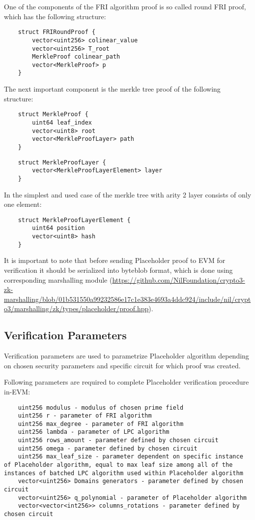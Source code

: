 One of the components of the FRI algorithm proof is so called round FRI proof, which has the following structure:

\begin{verbatim}
    struct FRIRoundProof {
        vector<uint256> colinear_value
        vector<uint256> T_root
        MerkleProof colinear_path
        vector<MerkleProof> p
    }
\end{verbatim}

The next important component is the merkle tree proof of the following structure:

\begin{verbatim}
    struct MerkleProof {
        uint64 leaf_index
        vector<uint8> root
        vector<MerkleProofLayer> path
    }
\end{verbatim}

\begin{verbatim}
    struct MerkleProofLayer {
        vector<MerkleProofLayerElement> layer
    }       
\end{verbatim}

In the simplest and used case of the merkle tree with arity 2 layer consists of only one element:

\begin{verbatim}
    struct MerkleProofLayerElement {
        uint64 position
        vector<uint8> hash
    }
\end{verbatim}

It is important to note that before sending Placeholder proof to EVM for verification it should be serialized into byteblob format,
which is done using corresponding marshalling module 
(\url{https://github.com/NilFoundation/crypto3-zk-marshalling/blob/01b531550a99232586e17c1e383e4693a4ddc924/include/nil/crypto3/marshalling/zk/types/placeholder/proof.hpp}).

\subsection{Verification Parameters}

Verification parameters are used to parametrize Placeholder algorithm depending on chosen security parameters and specific circuit for which proof was created.

Following parameters are required to complete Placeholder verification procedure in-EVM:

\begin{verbatim}
    uint256 modulus - modulus of chosen prime field
    uint256 r - parameter of FRI algorithm
    uint256 max_degree - parameter of FRI algorithm
    uint256 lambda - parameter of LPC algorithm
    uint256 rows_amount - parameter defined by chosen circuit
    uint256 omega - parameter defined by chosen circuit
    uint256 max_leaf_size - parameter dependent on specific instance of Placeholder algorithm, equal to max leaf size among all of the instances of batched LPC algorithm used within Placeholder algorithm
    vector<uint256> Domains generators - parameter defined by chosen circuit 
    vector<uint256> q_polynomial - parameter of Placeholder algorithm
    vector<vector<int256>> columns_rotations - parameter defined by chosen circuit
\end{verbatim}
